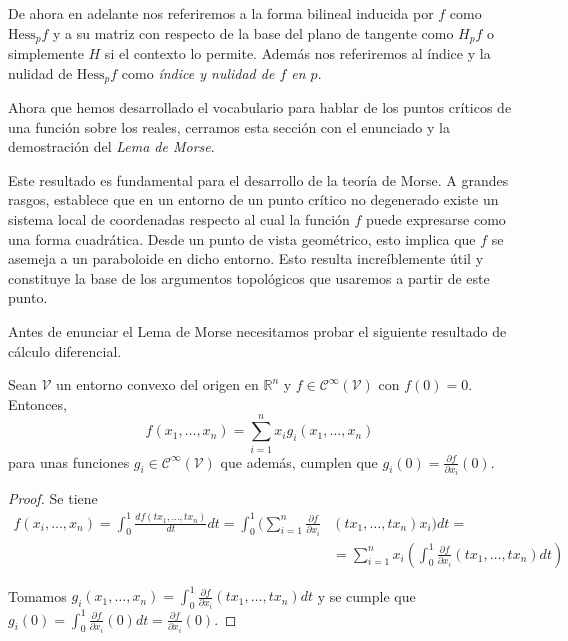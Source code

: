 \begin{nota}
    De ahora en adelante nos referiremos a la forma bilineal inducida por $f$ como $\text{Hess}_pf$ y a su matriz con respecto de la base del plano de tangente como $H_pf$ o simplemente $H$ si el contexto lo permite. Además nos referiremos al índice y la nulidad de $\text{Hess}_pf$ como \textit{índice y nulidad de $f$ en $p$}.
\end{nota}
\bigskip


Ahora que hemos desarrollado el vocabulario para hablar de los puntos críticos de una función sobre los reales, cerramos esta sección con el enunciado y la demostración del \textit{Lema de Morse}. 

Este resultado es fundamental para el desarrollo de la teoría de Morse. A grandes rasgos, establece que en un entorno de un punto crítico no degenerado existe un sistema local de coordenadas respecto al cual la función $f$ puede expresarse como una forma cuadrática. Desde un punto de vista geométrico, esto implica que $f$ se asemeja a un paraboloide en dicho entorno. Esto resulta increíblemente útil y constituye la base de los argumentos topológicos que usaremos a partir de este punto.

\bigskip

Antes de enunciar el Lema de Morse necesitamos probar el siguiente resultado de cálculo diferencial.

\begin{lemma}
    Sean $\mathcal{V}$ un entorno convexo del origen en $\mathbb{R}^n$ y $f\in \mathcal{C}^\infty(\mathcal{V})$ con $f(0)=0$. Entonces,
    \begin{equation*}
        f(x_1,\dots,x_n)=\sum_{i=1}^n x_ig_i(x_1,\dots,x_n)
    \end{equation*}
    para unas funciones $g_i\in \mathcal{C}^\infty(\mathcal{V})$ que además, cumplen que $g_i(0)=\frac{\partial f}{\partial x_i}(0)$.
\end{lemma}
\begin{proof}
    Se tiene
\begin{align*}
    f(x_i,\dots,x_n)=\int_0^1 \frac{df(tx_1,\dots,tx_n)}{dt}dt = \int_0^1 \big(\sum_{i=1}^n \frac{\partial f}{\partial x_i}&(tx_1,\dots,tx_n)x_i \big)dt =\\
    &=\sum_{i=1}^n x_i \left(\int_0^1 \frac{\partial f}{\partial x_i}(tx_1,\dots,tx_n )dt\right)
\end{align*}

Tomamos $g_i(x_1,\dots,x_n) = \int_0^1 \frac{\partial f}{\partial x_i}(tx_1,\dots,tx_n )dt$ y se cumple que $g_i(0)=\int_0^1 \frac{\partial f}{\partial x_i}(0)dt =\frac{\partial f}{\partial x_i}(0)$.

\end{proof}
\bigskip

